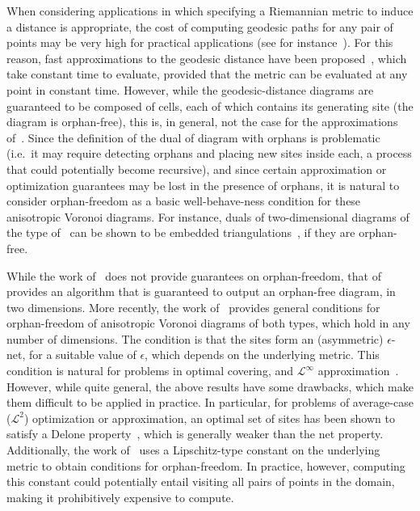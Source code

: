\documentclass[11pt]{article}
\begin{document}
When considering applications in which specifying a Riemannian metric to induce a distance is appropriate, 
 the cost of computing geodesic paths for any pair of points may be very high for practical applications (see for instance~\cite{MMP}). 
 For this reason, fast approximations to the geodesic distance have been proposed~\cite{DW,LS}, which take constant time to evaluate, provided that the metric can be evaluated at any point in constant time. 
 However, while the geodesic-distance diagrams are guaranteed to be composed of cells, each of which contains its generating site (the diagram is orphan-free), 
 	this is, in general, not the case for the approximations of~\cite{DW,LS}. 
Since the definition of the dual of diagram with orphans is problematic (i.e.\ it may require detecting orphans and placing new sites inside each, a process that could potentially become  recursive), 
and since certain approximation or optimization guarantees may be lost in the presence of orphans, 
it is natural to consider orphan-freedom as a basic well-behave-ness condition for these anisotropic Voronoi diagrams. 
For instance, duals of two-dimensional diagrams of the type of~\cite{DW} can be shown to be embedded triangulations~\cite{adt}, if they are orphan-free. 

While the work of~\cite{DW} does not provide guarantees on orphan-freedom, that of~\cite{LS} provides an algorithm that is guaranteed to output an orphan-free diagram, in two dimensions. 
More recently, the work of~\cite{avd} provides general conditions for orphan-freedom of anisotropic Voronoi diagrams of both types, 
	which hold in any number of dimensions. The condition is that the sites form an (asymmetric) $\epsilon$-net, for a suitable value of $\epsilon$, which depends on the underlying metric. 
This condition is natural for problems in optimal covering, and $\mathcal{L}^\infty$ approximation~\cite{GruberMenets,enets}. 
However, while quite general, the above results have some drawbacks, which make them difficult to be applied in practice. In particular, for problems of average-case ($\mathcal{L}^2$) optimization or approximation, an optimal set of sites has been shown to satisfy a Delone property~\cite{enets,OQ,GruberOQ}, which is generally weaker than the net property. 
Additionally, the work of~\cite{avd} uses a Lipschitz-type constant on the underlying metric to obtain conditions for orphan-freedom. 
In practice, however, computing this constant could potentially entail visiting all pairs of points in the domain, making it prohibitively expensive to compute. 
\end{document}
